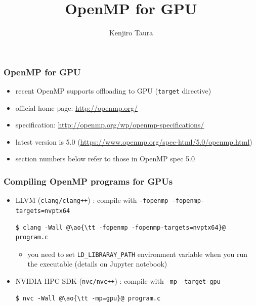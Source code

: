 \documentclass[12pt,dvipdfmx]{beamer}
\title{OpenMP for GPU}
\institute{}
\author{Kenjiro Taura}
\date{}
\newcommand{\ao}[1]{{\color{blue}#1}}
\begin{document}
\maketitle




\begin{frame}
\frametitle{OpenMP for GPU}
\begin{itemize}
\item recent OpenMP supports offloading to GPU ({\tt target} directive)
\item official home page:
  \url{http://openmp.org/}
\item specification:
  \url{http://openmp.org/wp/openmp-specifications/}
\item latest version is 5.0
(\url{https://www.openmp.org/spec-html/5.0/openmp.html})
\item section numbers below refer to those in OpenMP spec 5.0
\end{itemize}
\end{frame}

\begin{frame}[fragile]
\frametitle{Compiling OpenMP programs for GPUs}
\begin{itemize}
\item LLVM ({\tt clang/clang++}) : compile with {\tt -fopenmp -fopenmp-targets=nvptx64}
\begin{lstlisting}
$ clang -Wall @\ao{\tt -fopenmp -fopenmp-targets=nvptx64}@ program.c
\end{lstlisting}%
\begin{itemize}
\item you need to set {\tt LD\_LIBRARAY\_PATH} environment variable when you run the executable (details on Jupyter notebook)
\end{itemize}

\item NVIDIA HPC SDK ({\tt nvc/nvc++}) : compile with {\tt -mp -target-gpu}
\begin{lstlisting}
$ nvc -Wall @\ao{\tt -mp=gpu}@ program.c
\end{lstlisting}%
\end{itemize}
\end{frame}
\end{document}
